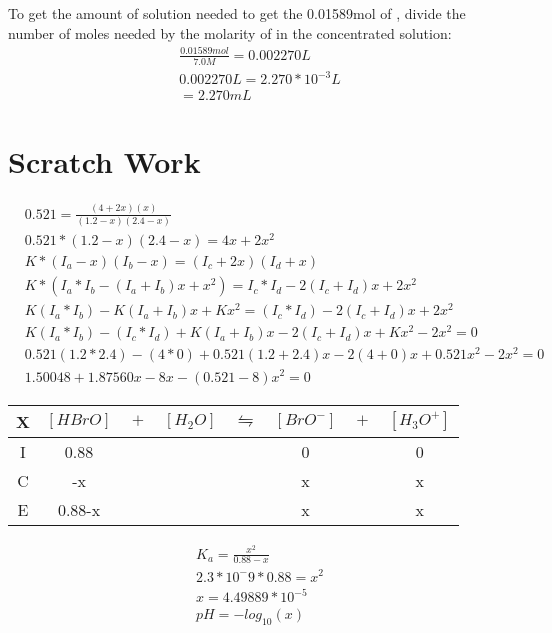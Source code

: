 \documentclass{article}  %
\begin{document}
To get the amount of solution needed to get the 0.01589mol of , divide the number of moles needed by the molarity of  in the concentrated solution:
\begin{equation*}
    \begin{aligned}
        \frac{0.01589mol}{7.0M} = 0.002270L \\
        0.002270L = 2.270*10^{-3}L \\
        = 2.270mL
    \end{aligned}
\end{equation*}
\section*{Scratch Work}

\begin{equation*}
    \begin{aligned}
        &0.521 = \frac{(4+2x)(x)}{(1.2-x)(2.4-x)} \\
        &0.521 * (1.2-x)(2.4-x) = 4x+ 2x^2 \\ 
        &K * (I_a - x)(I_b - x) = (I_c + 2x)(I_d + x)\\
        &K * (I_a* I_b - (I_a + I_b)x + x^2) = I_c* I_d - 2(I_c + I_d)x + 2x^2 \\
        &K(I_a* I_b) - K(I_a + I_b)x + Kx^2 = (I_c* I_d) - 2(I_c + I_d)x + 2x^2 \\
        &K(I_a* I_b) - (I_c* I_d) + K(I_a + I_b)x - 2(I_c + I_d)x + Kx^2 - 2x^2 = 0 \\
        &0.521(1.2*2.4) - (4*0) + 0.521(1.2 + 2.4)x - 2(4+0)x + 0.521x^2 - 2x^2 = 0 \\
        &1.50048 + 1.87560x - 8x - (0.521-8)x^2 = 0
    \end{aligned}
\end{equation*}

\begin{tabular}{c|c@{}c@{}c@{}c@{}c@{}c@{}c}
    \hline
    X   & $[HBrO]$ & ${}+{}$ & $[H_2O]$ & ${}\leftrightharpoons{}$ & $[BrO^-]$ & ${}+{}$ & $[H_3O^+]$ \\
    \hline
    I   &  0.88    &&     &&  0   && 0  \\
    C   &   -x   &&     &&  x   &&  x \\
    E   &   0.88-x   &&     &&   x  && x  \\      
\end{tabular}

\begin{equation*}
    \begin{aligned}
        K_a = \frac{x^2}{0.88-x} \\
        2.3*10^-9 * 0.88 = x^2 \\
        x = 4.49889*10^{-5} \\
        pH = -log_{10}(x)     
    \end{aligned}
\end{equation*}
\end{document}
